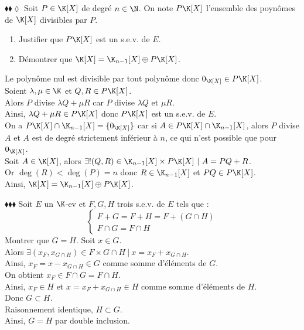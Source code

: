 \documentclass[11pt]{article}
\begin{document}
\begin{exercice}{$\blacklozenge\blacklozenge\lozenge$}{}
    Soit $P\in\K[X]$ de degré $n\in\N$. On note $P\K[X]$ l'ensemble des poynômes de $\K[X]$ divisibles par $P$.
    \begin{enumerate}
        \item Justifier que $P\K[X]$ est un s.e.v. de $E$.
        \item Démontrer que $\K[X] = \K_{n-1}[X] \oplus P\K[X]$.
    \end{enumerate}
    \tcblower
     Le polynôme nul est divisible par tout polynôme donc $0_{\K[X]} \in P\K[X]$.\\
    Soient $\lambda, \mu \in \K$ et $Q, R \in P\K[X]$.\\
    Alors $P$ divise $\lambda Q + \mu R$ car $P$ divise $\lambda Q$ et $\mu R$.\\
    Ainsi, $\lambda Q + \mu R \in P\K[X]$ donc $P\K[X]$ est un s.e.v. de $E$.\\[0.3cm]
     On a $P\K[X] \cap \K_{n-1}[X] = \{0_{\K[X]}\}$ car si $A \in P\K[X] \cap \K_{n-1}[X]$, alors $P$ divise $A$ et $A$ est de degré strictement inférieur à $n$, ce qui n'est possible que pour $0_{\K[X]}$.\\
    Soit $A \in \K[X]$, alors $\exists! (Q, R) \in \K_{n-1}[X] \times P\K[X] ~ | ~ A = PQ + R$.\\
    Or $\deg(R) < \deg(P) = n$ donc $R \in \K_{n-1}[X]$ et $PQ \in P\K[X]$.\\
    Ainsi, $\K[X] = \K_{n-1}[X] \oplus P\K[X]$.
\end{exercice}

\begin{exercice}{$\blacklozenge\blacklozenge\blacklozenge$}{}
    Soit $E$ un $\K$-ev et $F,G,H$ trois s.e.v. de $E$ tels que :
    \begin{equation*}
        \begin{cases}
            F + G = F + H = F + (G \cap H)\\
            F \cap G = F \cap H
        \end{cases}
    \end{equation*}
    Montrer que $G = H$.
    \tcblower 
    \fbox{$\subset$} Soit $x \in G$.\\
    Alors $\exists (x_F, x_{G\cap H}) \in F \times G \cap H ~ | ~ x = x_F + x_{G\cap H}$.\\
    Ainsi, $x_F = x - x_{G\cap H} \in G$ comme somme d'éléments de $G$.\\
    On obtient $x_F \in F \cap G = F \cap H$.\\
    Ainsi, $x_F \in H$ et $x = x_F + x_{G \cap H} \in H$ comme somme d'éléments de $H$.\\
    Donc $G \subset H$.\\[0.3cm]
    \fbox{$\supset$} Raisonnement identique, $H \subset G$.\\
    Ainsi, $G = H$ par double inclusion.
\end{exercice}
\end{document}
